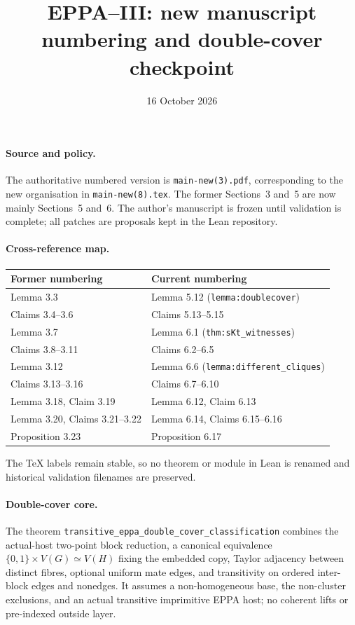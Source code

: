 \documentclass[11pt]{article}
\title{EPPA--III: new manuscript numbering and double-cover checkpoint}
\date{16 October 2026}
\begin{document}
\maketitle

\paragraph{Source and policy.}
The authoritative numbered version is \texttt{main-new(3).pdf},
corresponding to the new organisation in \texttt{main-new(8).tex}.
The former Sections~3 and~5 are now mainly Sections~5 and~6.
The author's manuscript is frozen until validation is complete;
all patches are proposals kept in the Lean repository.

\paragraph{Cross-reference map.}
\begin{center}
\begin{tabular}{@{}ll@{}}
\toprule
Former numbering & Current numbering\\
\midrule
Lemma 3.3 & Lemma 5.12 (\texttt{lemma:doublecover})\\
Claims 3.4--3.6 & Claims 5.13--5.15\\
Lemma 3.7 & Lemma 6.1 (\texttt{thm:sKt\_witnesses})\\
Claims 3.8--3.11 & Claims 6.2--6.5\\
Lemma 3.12 & Lemma 6.6 (\texttt{lemma:different\_cliques})\\
Claims 3.13--3.16 & Claims 6.7--6.10\\
Lemma 3.18, Claim 3.19 & Lemma 6.12, Claim 6.13\\
Lemma 3.20, Claims 3.21--3.22 & Lemma 6.14, Claims 6.15--6.16\\
Proposition 3.23 & Proposition 6.17\\
\bottomrule
\end{tabular}
\end{center}
The TeX labels remain stable, so no theorem or module in Lean is
renamed and historical validation filenames are preserved.

\paragraph{Double-cover core.}
The theorem
\texttt{transitive\_eppa\_double\_cover\_classification}
combines the actual-host two-point block reduction, a canonical
equivalence $\{0,1\}\times V(G)\simeq V(H)$ fixing the embedded copy,
Taylor adjacency between distinct fibres, optional uniform mate edges,
and transitivity on ordered inter-block edges and nonedges.
It assumes a non-homogeneous base, the non-cluster exclusions,
and an actual transitive imprimitive EPPA host; no coherent lifts or
pre-indexed outside layer.
\end{document}
